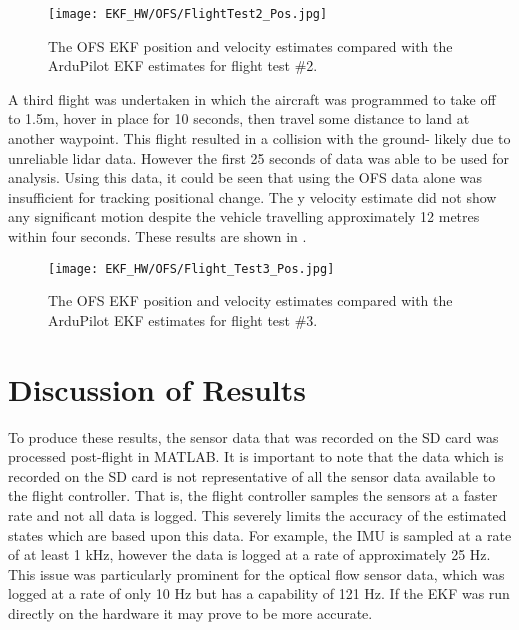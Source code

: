 \begin{figure}[htb]
	\texttt{[image: EKF\_HW/OFS/FlightTest2\_Pos.jpg]}%
	\caption{The OFS EKF position and velocity estimates compared with the ArduPilot EKF estimates for flight test \#2.}%
	\label{fig:HW_OFS_Pos}%
\end{figure}

A third flight was undertaken in which the aircraft was programmed to take off to 1.5m, hover in place for 10 seconds, then travel some distance to land at another waypoint. This flight resulted in a collision with the ground- likely due to unreliable lidar data. However the first 25 seconds of data was able to be used for analysis. Using this data, it could be seen that using the OFS data alone was insufficient for tracking positional change. The y velocity estimate did not show any significant motion despite the vehicle travelling approximately 12 metres within four seconds. These results are shown in .

\begin{figure}[htb]
	\texttt{[image: EKF\_HW/OFS/Flight\_Test3\_Pos.jpg]}%
	\caption{The OFS EKF position and velocity estimates compared with the ArduPilot EKF estimates for flight test \#3.}%
	\label{fig:HW_OFS_Pos_2}%
\end{figure}

\FloatBarrier
\section{Discussion of Results}
To produce these results, the sensor data that was recorded on the SD card was processed post-flight in MATLAB. It is important to note that the data which is recorded on the SD card is not representative of all the sensor data available to the flight controller. That is, the flight controller samples the sensors at a faster rate and not all data is logged. This severely limits the accuracy of the estimated states which are based upon this data. For example, the IMU is sampled at a rate of at least 1 kHz, however the data is logged at a rate of approximately 25 Hz. This issue was particularly prominent for the optical flow sensor data, which was logged at a rate of only 10 Hz but has a capability of 121 Hz. If the EKF was run directly on the hardware it may prove to be more accurate. \\

